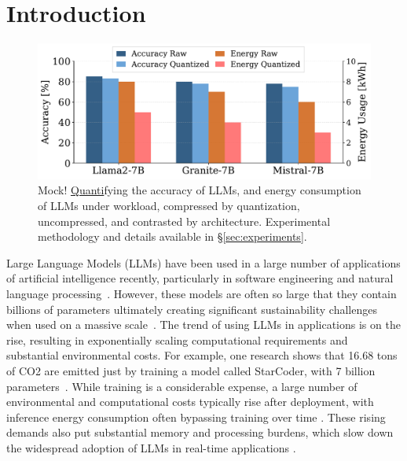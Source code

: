 
\section{Introduction}

\begin{figure}[t]
    \centering
    \includegraphics[width=0.95\linewidth]{reportTemplate/figures/f1.pdf}
    \caption{Mock! \underline{Quanti}fying the accuracy of LLMs, and energy consumption of LLMs under workload, compressed by quantization, uncompressed, and contrasted by architecture. Experimental methodology and details available in §\ref{sec:experiments}.}
    \label{fig:f1}
    
\end{figure}

Large Language Models (LLMs) have been used in a large number of applications of artificial intelligence recently, particularly in software engineering and natural language processing~\cite{DBLP:journals/corr/abs-1910-01108, 10968787}. However, these models are often so large that they contain billions of parameters ultimately creating significant sustainability challenges when used on a massive scale~\cite{DBLP:journals/tacl/ZhuLLMW24, DBLP:journals/corr/abs-1910-01108}. The trend of using LLMs in applications is on the rise, resulting in exponentially scaling computational requirements and substantial environmental costs. For example, one research shows that 16.68 tons of CO2 are emitted just by training a model called StarCoder, with 7 billion parameters~\cite{DBLP:journals/corr/abs-2507-09665}. While training is a considerable expense, a large number of environmental and computational costs typically rise after deployment, with inference energy consumption often bypassing training over time \cite{DBLP:journals/corr/abs-2507-09665}. These rising demands also put substantial memory and processing burdens, which slow down the widespread adoption of LLMs in real-time applications \cite{DBLP:journals/corr/abs-1910-01108}.



